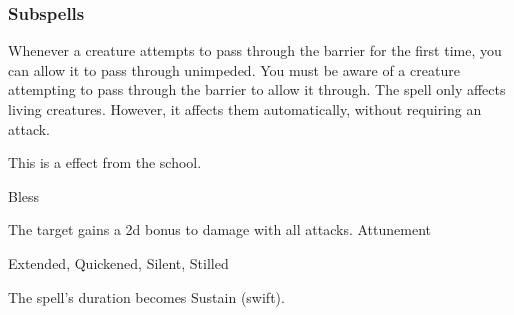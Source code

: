 \subsubsection{Subspells}
Whenever a creature attempts to pass through the barrier for the first time, you can allow it to pass through unimpeded.
You must be aware of a creature attempting to pass through the barrier to allow it through.
The spell only affects living creatures.
However, it affects them automatically, without requiring an attack.
\par
This is a  effect from the  school.
\begin{spellsection}{Bless}
\begin{spellheader}
\end{spellheader}
\begin{spellcontent}
\begin{spelltargetinginfo}
\end{spelltargetinginfo}
\begin{spelleffects}
\spelleffect The target gains a \plus2d bonus to damage with all attacks.
\spelldur Attunement
\end{spelleffects}
\end{spellcontent}
\begin{spellfooter}
 Extended, Quickened, Silent, Stilled
\end{spellfooter}
\begin{spellsubcontent}
\begin{spellcantrip}
The spell's duration becomes Sustain (swift).
\end{spellcantrip}
\end{spellsubcontent}
\end{spellsection}
